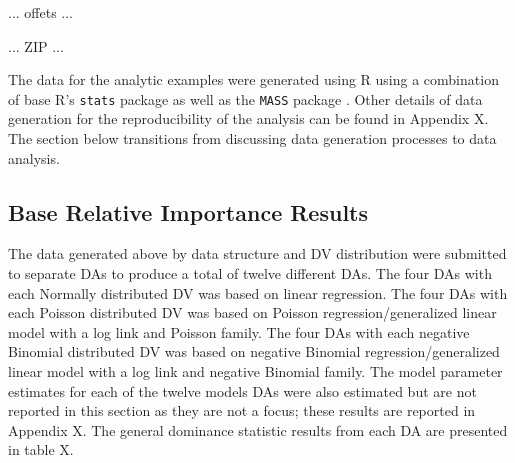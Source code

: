 \documentclass[ShortAfour,times,sageapa]{sagej}
\begin{document}
	... offets ...
	
	... ZIP ...
	
	The data for the analytic examples were generated using R \cite{R} using a combination of base R's \texttt{stats} package as well as the \texttt{MASS} package \cite{MASS}.  
	Other details of data generation for the reproducibility of the analysis can be found in Appendix X.  
	The section below transitions from discussing data generation processes to data analysis.
	
	\subsection{Base Relative Importance Results}
	
	The data generated above by data structure and DV distribution were submitted to separate DAs to produce a total of twelve different DAs.
	The four DAs with each Normally distributed DV was based on linear regression.
	The four DAs with each Poisson distributed DV was based on Poisson regression/generalized linear model with a log link and Poisson family.
	The four DAs with each negative Binomial distributed DV was based on negative Binomial regression/generalized linear model with a log link and negative Binomial family.
	The model parameter estimates for each of the twelve models DAs were also estimated but are not reported in this section as they are not a focus; these results are reported in Appendix X. 
	The general dominance statistic results from each DA are presented in table X.
	
	
	
	
\end{document}
